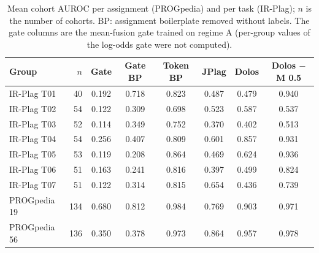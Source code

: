 \begin{table}[t]
\centering
\caption{Mean cohort AUROC per assignment (PROGpedia) and per task (IR-Plag); $n$ is the number of cohorts. BP: assignment boilerplate removed without labels. The gate columns are the mean-fusion gate trained on regime A (per-group values of the log-odds gate were not computed).}
\label{tab:cohort-detail}
\footnotesize
\setlength{\tabcolsep}{2.5pt}
\begin{tabular}{lr|cccccc}
\toprule
\textbf{Group} & $n$ & Gate & Gate BP & Token BP & JPlag & Dolos & Dolos $-$M 0.5 \\
\midrule
IR-Plag T01 & 40 & 0.192 & 0.718 & 0.823 & 0.487 & 0.479 & 0.940 \\
IR-Plag T02 & 54 & 0.122 & 0.309 & 0.698 & 0.523 & 0.587 & 0.537 \\
IR-Plag T03 & 52 & 0.114 & 0.349 & 0.752 & 0.370 & 0.402 & 0.513 \\
IR-Plag T04 & 54 & 0.256 & 0.407 & 0.809 & 0.601 & 0.857 & 0.931 \\
IR-Plag T05 & 53 & 0.119 & 0.208 & 0.864 & 0.469 & 0.624 & 0.936 \\
IR-Plag T06 & 51 & 0.163 & 0.241 & 0.816 & 0.397 & 0.499 & 0.824 \\
IR-Plag T07 & 51 & 0.122 & 0.314 & 0.815 & 0.654 & 0.436 & 0.739 \\
PROGpedia 19 & 134 & 0.680 & 0.812 & 0.984 & 0.769 & 0.903 & 0.971 \\
PROGpedia 56 & 136 & 0.350 & 0.378 & 0.973 & 0.864 & 0.957 & 0.978 \\
\bottomrule
\end{tabular}
\end{table}